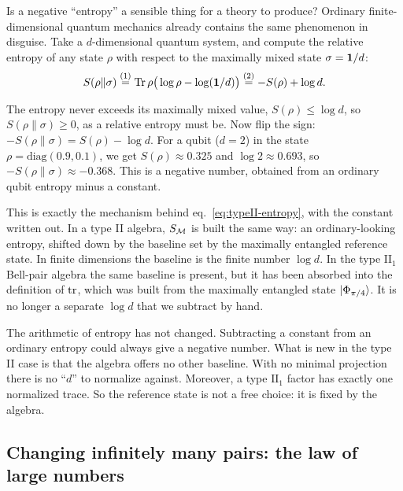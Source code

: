\begin{physconnect}
Is a negative ``entropy'' a sensible thing for a theory to produce? Ordinary finite-dimensional quantum
mechanics already contains the same phenomenon in disguise. Take a $d$-dimensional quantum system, and compute
the relative entropy of any state $\rho$ with respect to the maximally mixed state $\sigma=\mathbf{1}/d$:
\begin{align}
S(\rho\|\sigma) \overset{(1)}{=} \operatorname{Tr}\rho\big(\log\rho - \log(\mathbf{1}/d)\big) \overset{(2)}{=} -S(\rho) + \log d . \notag
\end{align}
\quad
{}

The entropy never exceeds its maximally mixed value, $S(\rho)\le\log d$, so $S(\rho\|\sigma)\ge0$, as a relative
entropy must be. Now flip the sign: $-S(\rho\|\sigma)=S(\rho)-\log d$. For a qubit ($d=2$) in the state
$\rho=\mathrm{diag}(0.9,0.1)$, we get $S(\rho)\approx0.325$ and $\log2\approx0.693$, so
$-S(\rho\|\sigma)\approx-0.368$. This is a negative number, obtained from an ordinary qubit entropy minus a
constant.

This is exactly the mechanism behind eq.~\eqref{eq:typeII-entropy}, with the constant written out. In a type II
algebra, $S_{\mathcal{M}}$ is built the same way: an ordinary-looking entropy, shifted down by the baseline set by the
maximally entangled reference state. In finite dimensions the baseline is the finite number $\log d$. In the
type $\mathrm{II}_1$ Bell-pair algebra the same baseline is present, but it has been absorbed into the
definition of $\operatorname{tr}$, which was built from the maximally entangled state $\ket{\Phi_{\pi/4}}$. It is no longer a
separate $\log d$ that we subtract by hand.

The arithmetic of entropy has not changed. Subtracting a constant from an ordinary entropy could always give a
negative number. What is new in the type II case is that the algebra offers no other baseline. With no minimal
projection there is no ``$d$'' to normalize against. Moreover, a type $\mathrm{II}_1$ factor has exactly one
normalized trace. So the reference state is not a free choice: it is fixed by the algebra.
\end{physconnect}

\subsection*{Changing infinitely many pairs: the law of large numbers}

